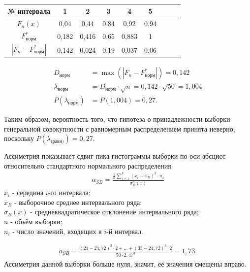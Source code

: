 \documentclass[utf8, a4paper, 14pt, russian, oneside]{book}
\begin{document}
\begin{table}[h!]
    \centering
    \begin{tabular}{|c|c|c|c|c|c|c|c|c|}
        \hline
        № интервала & 1 & 2 & 3 & 4 & 5 \\
        \hline
        $F_n(x)$ & 0,04 & 0,44 & 0,84 & 0,92 & 0,94 \\
        \hline
        $F^*_{\text{норм}}$ & 0,182 & 0,416 & 0,65 & 0,883 & 1 \\
        \hline
        $| F_n - F^*_{\text{норм}} |$ & 0,142 & 0,024 & 0,19 & 0,037 & 0,06 \\
        \hline
    \end{tabular}
\end{table}
\begin{align*}
    D_{\text{норм}} &= \max{(|F_n - F^*_{\text{норм}}|)} = 0,142 \\
    \lambda_{\text{норм}} &= D_{\text{норм}} \cdot \sqrt{n} = 0,142 \cdot \sqrt{50} = 1,004\\
    P(\lambda_{\text{норм}}) &= P(1,004) = 0,27.
\end{align*}

Таким образом, вероятность того, что гипотеза о принадлежности выборки генеральной совокупности с равномерным распределением принята неверно, поскольку $P(\lambda_{\text{(равн)}}) = 0,27$.

\newpage
{}

Ассиметрия показывает сдвиг пика гистограммы выборки по оси абсцисс относительно стандартного нормального распределения.
\begin{align*}
    \alpha_{SB} = \frac{
        \frac{1}{n} \sum_{i=1}^{k}(x_i - \overline{x}_B)^3 \cdot n_i
    }{\sigma_B^3(x)}    
\end{align*}
$x_i$ - середина $i$-го интервала;\\
$\overline{x}_B$ - выборочное среднее интервального ряда;\\
$\sigma_B(x)$ - среднеквадратическое отклонение интервального ряда;\\
$n$ - объём выборки;\\
$n_i$ - число значений, входящих в $i$-й интервал.

\begin{align*}
    a_{SB} = \frac{(21 - 24,72)^3 \cdot 2 + \ldots + (33 - 24,72)^3 \cdot 2}{50 \cdot 2,47^3} = 1,73.
\end{align*}
Ассиметрия данной выборки больше нуля, значит, её значения смещены вправо.
\end{document}
